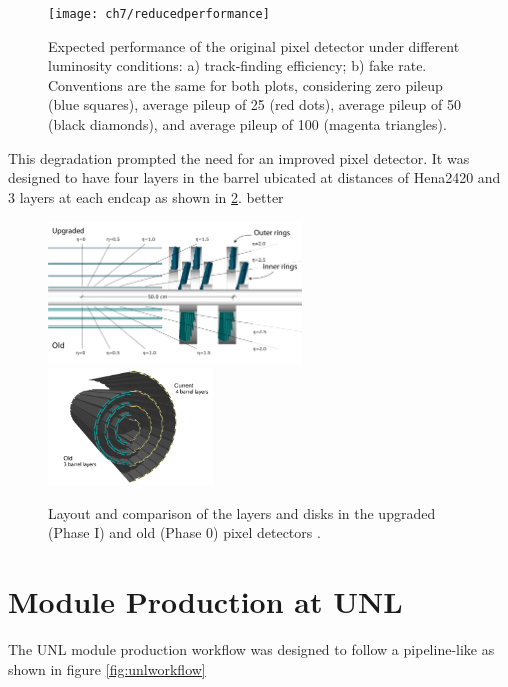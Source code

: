 \begin{figure}[!h]
\centering
\texttt{[image: ch7/reducedperformance]}
\caption[Expected performance of the original pixel detector for different luminosities.]{Expected performance of the original pixel detector under different luminosity conditions: a) track-finding efficiency; b) fake rate. Conventions are the same for both plots, considering zero pileup (blue squares), average pileup of 25 (red dots), average pileup of 50 (black diamonds), and average pileup of 100 (magenta triangles).\cite{pix_tdr}}\label{fig:red_perf}
\end{figure}

This degradation prompted the need for an improved pixel detector. It was designed to have four layers in the barrel ubicated at distances of Hena2420
and 3 layers at each endcap as shown in \ref{fig:new_pix}. better 







\begin{figure}[!h]
\centering
\includegraphics[width=0.6\textwidth]{../images/ch7/fpix.pdf}
\includegraphics[width=0.39\textwidth]{../images/ch7/bpix.pdf}
\caption[Layout of the upgraded and old pixel detectors.]{Layout and comparison of the layers and disks in the upgraded (Phase I) and old (Phase 0) pixel detectors \cite{pix_tdr}.}\label{fig:new_pix}
\end{figure}

\section{Module Production at UNL}
The UNL module production workflow was designed to follow a pipeline-like as shown in figure \ref{fig:unlworkflow}

